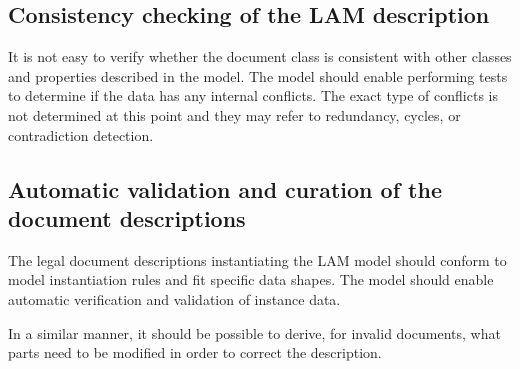 \subsection{Consistency checking of the LAM
description}\label{consistency-checking-of-the-lam-description}

It is not easy to verify whether the document class is consistent with
other classes and properties described in the model. The model should
enable performing tests to determine if the data has any internal
conflicts. The exact type of conflicts is not determined at this point
and they may refer to redundancy, cycles, or contradiction detection.

\subsection{Automatic validation and curation of the document
descriptions}\label{automatic-validation-and-curation-of-the-document-descriptions}

The legal document descriptions instantiating the LAM model should conform to model instantiation rules and fit specific data shapes. The model should enable automatic verification and validation of instance
data.

In a similar manner, it should be possible to derive, for invalid
documents, what parts need to be modified in order to correct the
description.
